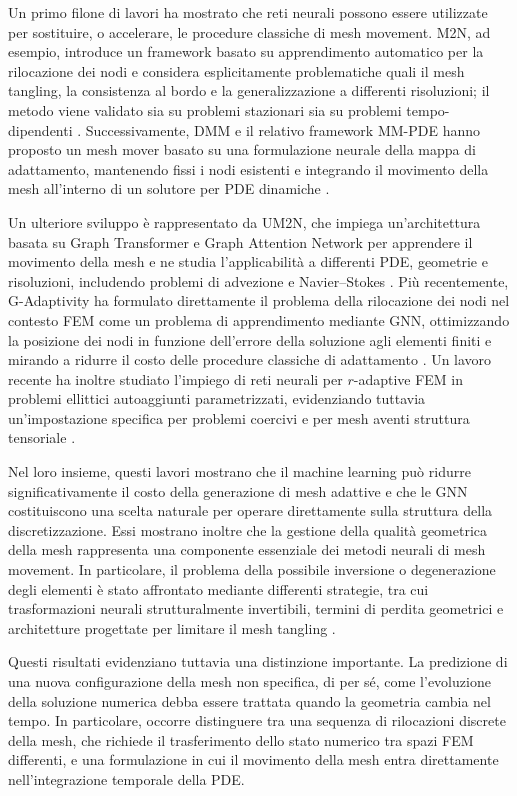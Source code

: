 Un primo filone di lavori ha mostrato che reti neurali possono essere utilizzate per sostituire, o accelerare, le procedure classiche di mesh movement. M2N, ad esempio, introduce un framework basato su apprendimento automatico per la rilocazione dei nodi e considera esplicitamente problematiche quali il mesh tangling, la consistenza al bordo e la generalizzazione a differenti risoluzioni; il metodo viene validato sia su problemi stazionari sia su problemi tempo-dipendenti \citep{song2022m2n}. Successivamente, DMM e il relativo framework MM-PDE hanno proposto un mesh mover basato su una formulazione neurale della mappa di adattamento, mantenendo fissi i nodi esistenti e integrando il movimento della mesh all'interno di un solutore per PDE dinamiche \citep{hu2024better}.

Un ulteriore sviluppo è rappresentato da UM2N, che impiega un'architettura basata su Graph Transformer e Graph Attention Network per apprendere il movimento della mesh e ne studia l'applicabilità a differenti PDE, geometrie e risoluzioni, includendo problemi di advezione e Navier--Stokes \citep{zhang2024towards}. Più recentemente, G-Adaptivity ha formulato direttamente il problema della rilocazione dei nodi nel contesto FEM come un problema di apprendimento mediante GNN, ottimizzando la posizione dei nodi in funzione dell'errore della soluzione agli elementi finiti e mirando a ridurre il costo delle procedure classiche di adattamento \citep{rowbottom2024g}. Un lavoro recente ha inoltre studiato l'impiego di reti neurali per $r$-adaptive FEM in problemi ellittici autoaggiunti parametrizzati, evidenziando tuttavia un'impostazione specifica per problemi coercivi e per mesh aventi struttura tensoriale \citep{aballay2026radaptive}.

Nel loro insieme, questi lavori mostrano che il machine learning può ridurre significativamente il costo della generazione di mesh adattive e che le GNN costituiscono una scelta naturale per operare direttamente sulla struttura della discretizzazione. Essi mostrano inoltre che la gestione della qualità geometrica della mesh rappresenta una componente essenziale dei metodi neurali di mesh movement. In particolare, il problema della possibile inversione o degenerazione degli elementi è stato affrontato mediante differenti strategie, tra cui trasformazioni neurali strutturalmente invertibili, termini di perdita geometrici e architetture progettate per limitare il mesh tangling \citep{song2022m2n,zhang2024towards}.

Questi risultati evidenziano tuttavia una distinzione importante. La predizione di una nuova configurazione della mesh non specifica, di per sé, come l'evoluzione della soluzione numerica debba essere trattata quando la geometria cambia nel tempo. In particolare, occorre distinguere tra una sequenza di rilocazioni discrete della mesh, che richiede il trasferimento dello stato numerico tra spazi FEM differenti, e una formulazione in cui il movimento della mesh entra direttamente nell'integrazione temporale della PDE.


